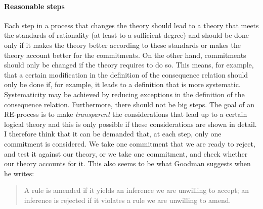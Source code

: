\documentclass{article}
\begin{document}
\paragraph{Reasonable steps} Each step in a process that changes the theory should lead to a theory that meets the standards of rationality (at least to a sufficient degree) and should be done only if it makes the theory better according to these standards or makes the theory account better for the commitments. On the other hand, commitments should only be changed if the theory requires to do so. This means, for example, that a certain modification in the definition of the consequence relation should only be done if, for example, it leads to a definition that is more systematic. Systematicity may be achieved by reducing exceptions in the definition of the consequence relation. Furthermore, there should not be big steps. The goal of an RE-process is to make \textit{transparent} the considerations that lead up to a certain logical theory and this is only possible if these considerations are shown in detail. I therefore think that it can be demanded that, at each step, only one commitment is considered. We take one commitment that we are ready to reject, and test it against our theory, or we take one commitment, and check whether our theory accounts for it. This also seems to be what Goodman suggests when he writes:

\begin{quote}
    A rule is amended if it yields an inference we are unwilling to accept; an inference is rejected if it violates a rule we are unwilling to amend. \cite[p.~64]{Goodman}
\end{quote}

\end{document}
